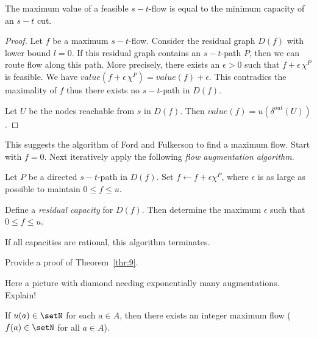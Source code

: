 \begin{theorem}
  \label{thr:8}
  The maximum value of a feasible $s-t$-flow is equal to the minimum
  capacity of an $s-t$ cut.
\end{theorem}

\begin{proof}
  Let $f$ be a maximum $s-t$-flow. Consider the residual graph $D(f)$
  with lower bound $l=0$. If this residual graph contains an
  $s-t$-path $P$, then we can route flow along this path. More
  precisely, there exists an $\epsilon>0$ such that $f + \epsilon \, \chi^P$ is feasible.
  We have $value(f + \epsilon \, \chi^P) = value(f) + \epsilon $. This contradics the
  maximality of $f$ thus there exists no $s-t$-path in $D(f)$. 
  
  Let $U$ be the nodes reachable from $s$ in $D(f)$. Then 
  $value(f)=u(\delta^{out}(U))$.  
\end{proof}
 


This suggests the algorithm of Ford and Fulkerson to find a maximum
flow. Start with $f = 0$. Next iteratively apply the following
\emph{flow augmentation algorithm}. 


Let $P$ be a directed $s-t$-path in $D(f)$. Set $f \gets f + \epsilon\chi^P$, where
$\epsilon$ is as large as possible to maintain $0\leq f\leq u$. 

\begin{exercise}  
  Define a \emph{residual capacity} for $D(f)$. Then determine the
  maximum $\epsilon$ such that $0\leq f\leq u$. 
\end{exercise}


\begin{theorem}
  \label{thr:9}
  If all capacities are rational, this algorithm terminates. 
\end{theorem}


\begin{exercise}
  Provide a proof of Theorem~\ref{thr:9}. 
\end{exercise}

\vspace{2cm} Here a picture with diamond needing exponentially many
augmentations. Explain! 



\begin{corollary}
  If $u(a) \in \setN$ for each $a \in A$, then there exists an integer maximum
  flow ($f(a) \in \setN$ for all $a \in A$). 
\end{corollary}




